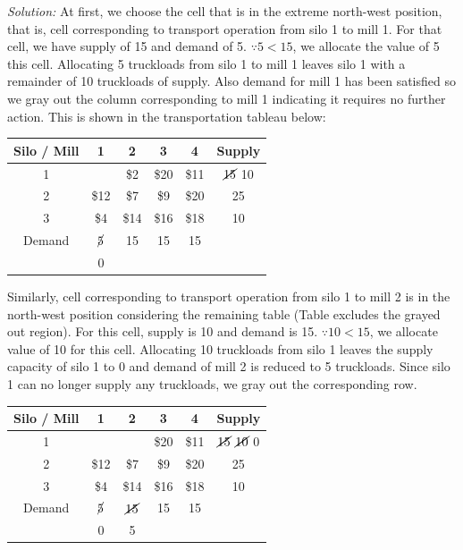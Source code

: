 \textit{Solution:}
At first, we choose the cell that is in the extreme north-west position, that is, cell corresponding to transport operation from silo 1 to mill 1. For that cell, we have supply of 15 and demand of 5. $ \because 5 < 15$, we allocate the value of 5 this cell. Allocating 5 truckloads from silo 1 to mill 1 leaves silo 1 with a remainder of 10 truckloads of supply. Also demand for mill 1 has been satisfied so we gray out the column corresponding to mill 1 indicating it requires no further action. This is shown in the transportation tableau below:
\begin{center}
	\begin{tabular}{c | c | c | c | c | c}
		Silo / Mill & 1 & 2 & 3 & 4 & \textbf{Supply}\\ 
		\hline
		1 & \innerbox{\$10}{5} \cellcolor[gray]{0.8} & \$2 & \$20 & \$11 & $ \cancel{15} $ 10\\
		\hline
		2 & \$12 \cellcolor[gray]{0.8} & \$7 & \$9 & \$20 & 25\\
		\hline
		3 & \$4 \cellcolor[gray]{0.8} & \$14 & \$16 & \$18 & 10\\
		\hline
		Demand & $ \cancel{5} $ & 15 & 15 & 15 & \\
		 & 0 & & & & 
	\end{tabular}
\end{center}
Similarly, cell corresponding to transport operation from silo 1 to mill 2 is in the north-west position considering the remaining table (Table excludes the grayed out region). For this cell, supply is 10 and demand is 15. $\because 10 < 15$, we allocate value of 10 for this cell. Allocating 10 truckloads from silo 1 leaves the supply capacity of silo 1 to 0 and demand of mill 2 is reduced to 5 truckloads. Since silo 1 can no longer supply any truckloads, we gray out the corresponding row.
\begin{center}
	\begin{tabular}{c | c | c | c | c | c}
		Silo / Mill & 1 & 2 & 3 & 4 & \textbf{Supply}\\ 
		\hline
		1 & \innerbox{\$10}{5} \cellcolor[gray]{0.8} & \innerbox{\$2}{10} \cellcolor[gray]{0.8} & \$20 \cellcolor[gray]{0.8} & \$11 \cellcolor[gray]{0.8} & $ \cancel{15} $ $ \cancel{10} $ 0\\
		\hline
		2 & \$12 \cellcolor[gray]{0.8} & \$7 & \$9 & \$20 & 25\\
		\hline
		3 & \$4 \cellcolor[gray]{0.8} & \$14 & \$16 & \$18 & 10\\
		\hline
		Demand & $ \cancel{5} $ & $ \cancel{15} $ & 15 & 15 & \\
		& 0 & 5 & & & 
	\end{tabular}
\end{center}
